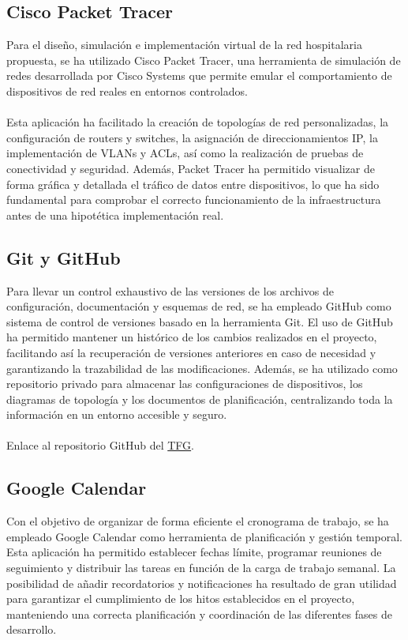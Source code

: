 \subsection{Cisco Packet Tracer}
Para el diseño, simulación e implementación virtual de la red hospitalaria propuesta, se ha utilizado Cisco Packet Tracer, una herramienta de simulación de redes 
desarrollada por Cisco Systems que permite emular el comportamiento de dispositivos de red reales en entornos controlados. 
\\ \\
Esta aplicación ha facilitado la creación de topologías de red personalizadas, la configuración de routers y switches, la asignación de direccionamientos IP, la 
implementación de VLANs y ACLs, así como la realización de pruebas de conectividad y seguridad. Además, Packet Tracer ha permitido visualizar de forma gráfica y 
detallada el tráfico de datos entre dispositivos, lo que ha sido fundamental para comprobar el correcto funcionamiento de la infraestructura antes de una hipotética 
implementación real.

\subsection{Git y GitHub}
Para llevar un control exhaustivo de las versiones de los archivos de configuración, documentación y esquemas de red, se ha empleado GitHub como sistema de control de 
versiones basado en la herramienta Git.
El uso de GitHub ha permitido mantener un histórico de los cambios realizados en el proyecto, facilitando así la recuperación de versiones anteriores en caso de necesidad 
y garantizando la trazabilidad de las modificaciones. Además, se ha utilizado como repositorio privado para almacenar las configuraciones de dispositivos, los diagramas de 
topología y los documentos de planificación, centralizando toda la información en un entorno accesible y seguro.
\\ \\
Enlace al repositorio GitHub del \href{https://github.com/VictorC02/Hospitalary_Network}{TFG}.

\subsection{Google Calendar}
Con el objetivo de organizar de forma eficiente el cronograma de trabajo, se ha empleado Google Calendar como herramienta de planificación y gestión temporal. Esta 
aplicación ha permitido establecer fechas límite, programar reuniones de seguimiento y distribuir las tareas en función de la carga de trabajo semanal. La posibilidad 
de añadir recordatorios y notificaciones ha resultado de gran utilidad para garantizar el cumplimiento de los hitos establecidos en el proyecto, manteniendo una correcta 
planificación y coordinación de las diferentes fases de desarrollo.

